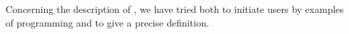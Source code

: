 Concerning the description of \ML, we have tried both to initiate
users by examples of programming and to give a precise definition.









